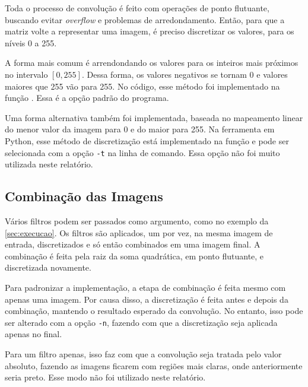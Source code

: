     Toda o processo de convolução é feito com operações de ponto flutuante, buscando evitar \textit{overflow} e problemas de arredondamento. Então, para que a matriz volte a representar uma imagem, é preciso discretizar os valores, para os níveis 0 a 255.

    A forma mais comum é arrendondando os valores para os inteiros mais próximos no intervalo $[0, 255]$. Dessa forma, os valores negativos se tornam 0 e valores maiores que 255 vão para 255. No código, esse método foi implementado na função . Essa é a opção padrão do programa.

    Uma forma alternativa também foi implementada, baseada no mapeamento linear do menor valor da imagem para 0 e do maior para 255. Na ferramenta em Python, esse método de discretização está implementado na função  e pode ser selecionada com a opção \texttt{-t} na linha de comando. Essa opção não foi muito utilizada neste relatório.

\subsection{Combinação das Imagens} \label{sec:impl:n}

    Vários filtros podem ser passados como argumento, como no exemplo da \cref{sec:execucao}. Os filtros são aplicados, um por vez, na mesma imagem de entrada, discretizados e só então combinados em uma imagem final. A combinação é feita pela raiz da soma quadrática, em ponto flutuante, e discretizada novamente.

    Para padronizar a implementação, a etapa de combinação é feita mesmo com apenas uma imagem. Por causa disso, a discretização é feita antes e depois da combinação, mantendo o resultado esperado da convolução. No entanto, isso pode ser alterado com a opção \texttt{-n}, fazendo com que a discretização seja aplicada apenas no final.

    Para um filtro apenas, isso faz com que a convolução seja tratada pelo valor absoluto, fazendo as imagens ficarem com regiões mais claras, onde anteriormente seria preto. Esse modo não foi utilizado neste relatório.
